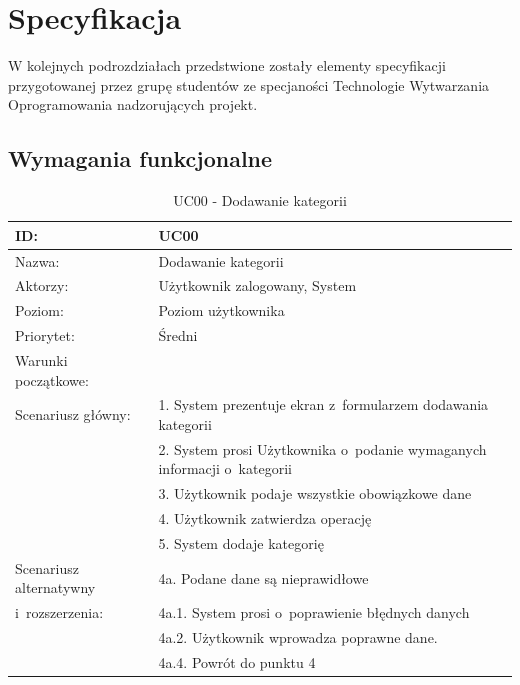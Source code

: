 \chapter{Specyfikacja}

W kolejnych podrozdziałach przedstwione zostały elementy specyfikacji przygotowanej przez grupę studentów ze specjaności Technologie Wytwarzania Oprogramowania nadzorujących projekt.

\section{Wymagania funkcjonalne}

\begin{table}[H]
    \begin{tabular}{|p{5cm}|p{9cm}|}\hline
	ID: & UC00 \\\hline
    Nazwa: & Dodawanie kategorii \\\hline
    Aktorzy: & Użytkownik zalogowany, System \\\hline
    Poziom: & Poziom użytkownika  \\\hline
    Priorytet: & Średni \\\hline
    Warunki początkowe: & ~ \\\hline
    Scenariusz główny: & 1. System prezentuje ekran z~formularzem dodawania kategorii \\
    ~ & 2. System prosi Użytkownika o~podanie wymaganych informacji o~kategorii \\
    ~ & 3. Użytkownik podaje wszystkie obowiązkowe dane \\
    ~ & 4. Użytkownik zatwierdza operację \\
    ~ & 5. System dodaje kategorię \\\hline
    Scenariusz alternatywny & 4a. Podane dane są nieprawidłowe \\
    i~rozszerzenia: & 4a.1. System prosi o~poprawienie błędnych danych \\
    ~ & 4a.2. Użytkownik wprowadza poprawne dane. \\
    ~ & 4a.4. Powrót do punktu 4 \\
    \hline\end{tabular}
	\caption{UC00 - Dodawanie kategorii}
\end{table}


